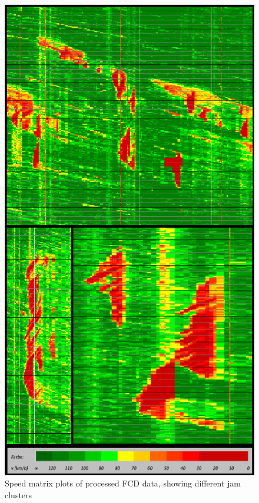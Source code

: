 \documentclass[a4paper,12pt]{report}
\begin{document}
\begin{figure}[h]
	\centering
	\includegraphics[scale=0.8]{./assets/SpeedMatrixPlot_mutiple}
	\caption{Speed matrix plots of processed FCD data, showing different jam clusters}
	\label{img:speedMatrixPlot_mutipleMixedClusters}
\end{figure}
\end{document}
